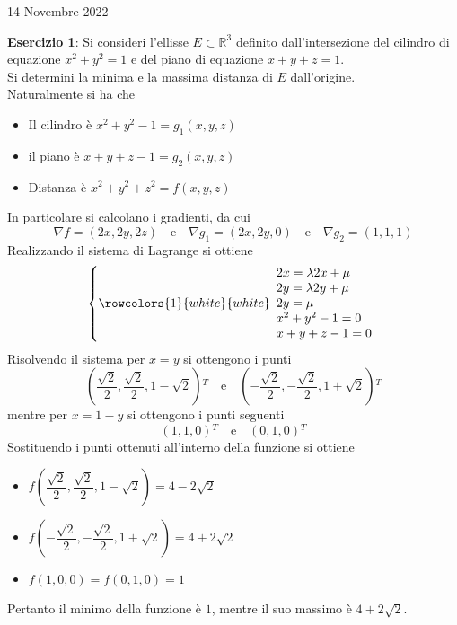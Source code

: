 \documentclass[a4paper]{extarticle}
\begin{document}
\newpage
\noindent
\begin{center}
    14 Novembre 2022
\end{center}
\textbf{Esercizio 1}: Si consideri l'ellisse $E \subset \mathbb{R}^3$ definito dall'intersezione del cilindro di equazione $x^2+y^2=1$ e del piano di equazione $x+y+z=1$.\\
Si determini la minima e la massima distanza di $E$ dall'origine.\\
Naturalmente si ha che
\begin{itemize}
    \item Il cilindro è $x^2+y^2-1=g_1(x,y,z)$
    \item il piano è $x+y+z-1=g_2(x,y,z)$
    \item Distanza è $x^2+y^2+z^2 = f(x,y,z)$
\end{itemize}
In particolare si calcolano i gradienti, da cui
\[\nabla f = (2x,2y,2z) \hspace{1em} \text{e} \hspace{1em} \nabla g_1 = (2x,2y,0) \hspace{1em} \text{e} \hspace{1em} \nabla g_2 = (1,1,1)\]
Realizzando il sistema di Lagrange si ottiene
\[
    \left\{
    \rowcolors{1}{white}{white}
    \begin{array}{l}
        2x=\lambda 2x + \mu\\
        2y=\lambda 2y + \mu\\
        2y = \mu\\
        x^2+y^2-1=0\\
        x+y+z-1=0
    \end{array}
    \right.
\]
Risolvendo il sistema per $x=y$ si ottengono i punti
\[\left(\dfrac{\sqrt{2}}{2},\dfrac{\sqrt{2}}{2},1-\sqrt{2}\right){^T} \hspace{1em} \text{e} \hspace{1em} \left(-\dfrac{\sqrt{2}}{2},-\dfrac{\sqrt{2}}{2},1+\sqrt{2}\right){^T}\]
mentre per $x=1-y$ si ottengono i punti seguenti
\[(1,1,0){^T} \hspace{1em} \text{e} \hspace{1em} (0,1,0){^T}\]
Sostituendo i punti ottenuti all'interno della funzione si ottiene
\begin{itemize}
    \item $f \left(\dfrac{\sqrt{2}}{2},\dfrac{\sqrt{2}}{2},1-\sqrt{2}\right) = 4 - 2 \sqrt{2}$
    \item $f \left(-\dfrac{\sqrt{2}}{2},-\dfrac{\sqrt{2}}{2},1+\sqrt{2}\right) = 4 + 2 \sqrt{2}$
    \item $f(1,0,0) = f(0,1,0)=1$
\end{itemize}
Pertanto il minimo della funzione è $1$, mentre il suo massimo è $4+2 \sqrt{2}$.
\end{document}

